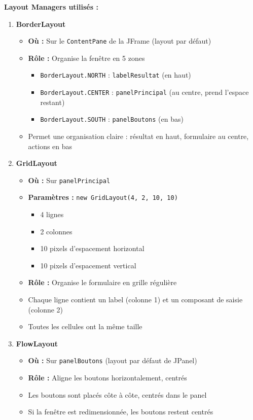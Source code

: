 \documentclass[11pt,a4paper]{article}
\begin{document}
\begin{correctionbox}
\textbf{Layout Managers utilisés :}

\begin{enumerate}
    \item \textbf{BorderLayout}
    \begin{itemize}
        \item \textbf{Où :} Sur le \texttt{ContentPane} de la JFrame (layout par défaut)
        \item \textbf{Rôle :} Organise la fenêtre en 5 zones
        \begin{itemize}
            \item \texttt{BorderLayout.NORTH} : \texttt{labelResultat} (en haut)
            \item \texttt{BorderLayout.CENTER} : \texttt{panelPrincipal} (au centre, prend l'espace restant)
            \item \texttt{BorderLayout.SOUTH} : \texttt{panelBoutons} (en bas)
        \end{itemize}
        \item Permet une organisation claire : résultat en haut, formulaire au centre, actions en bas
    \end{itemize}
    
    \item \textbf{GridLayout}
    \begin{itemize}
        \item \textbf{Où :} Sur \texttt{panelPrincipal}
        \item \textbf{Paramètres :} \texttt{new GridLayout(4, 2, 10, 10)}
        \begin{itemize}
            \item 4 lignes
            \item 2 colonnes
            \item 10 pixels d'espacement horizontal
            \item 10 pixels d'espacement vertical
        \end{itemize}
        \item \textbf{Rôle :} Organise le formulaire en grille régulière
        \item Chaque ligne contient un label (colonne 1) et un composant de saisie (colonne 2)
        \item Toutes les cellules ont la même taille
    \end{itemize}
    
    \item \textbf{FlowLayout}
    \begin{itemize}
        \item \textbf{Où :} Sur \texttt{panelBoutons} (layout par défaut de JPanel)
        \item \textbf{Rôle :} Aligne les boutons horizontalement, centrés
        \item Les boutons sont placés côte à côte, centrés dans le panel
        \item Si la fenêtre est redimensionnée, les boutons restent centrés
    \end{itemize}
\end{enumerate}


\end{correctionbox}
\end{document}
